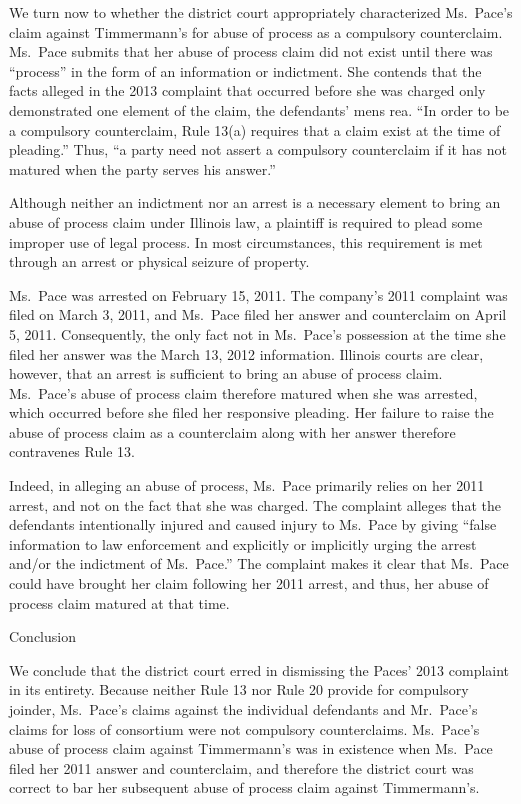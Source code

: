 \documentclass[11pt,letterpaper,twoside]{article}
\begin{document}
We turn now to whether the district court appropriately characterized
Ms.~Pace's claim against Timmermann's for abuse of process as a
compulsory counterclaim. Ms.~Pace submits that her abuse of process
claim did not exist until there was ``process'' in the form of an
information or indictment. She contends that the facts alleged in the
2013 complaint that occurred before she was charged only demonstrated
one element of the claim, the defendants' mens rea. ``In order to be a
compulsory counterclaim, Rule 13(a) requires that a claim exist at the
time of pleading.'' Thus, ``a party need not assert a compulsory
counterclaim if it has not matured when the party serves his answer.''

Although neither an indictment nor an arrest is a necessary element to
bring an abuse of process claim under Illinois law, a plaintiff is
required to plead some improper use of legal process. In most
circumstances, this requirement is met through an arrest or physical
seizure of property.

Ms.~Pace was arrested on February 15, 2011. The company's 2011 complaint
was filed on March 3, 2011, and Ms.~Pace filed her answer and
counterclaim on April 5, 2011. Consequently, the only fact not in
Ms.~Pace's possession at the time she filed her answer was the March 13,
2012 information. Illinois courts are clear, however, that an arrest is
sufficient to bring an abuse of process claim. Ms.~Pace's abuse of
process claim therefore matured when she was arrested, which occurred
before she filed her responsive pleading. Her failure to raise the abuse
of process claim as a counterclaim along with her answer therefore
contravenes Rule 13.

Indeed, in alleging an abuse of process, Ms.~Pace primarily relies on
her 2011 arrest, and not on the fact that she was charged. The complaint
alleges that the defendants intentionally injured and caused injury to
Ms.~Pace by giving ``false information to law enforcement and explicitly
or implicitly urging the arrest and/or the indictment of Ms.~Pace.'' The
complaint makes it clear that Ms.~Pace could have brought her claim
following her 2011 arrest, and thus, her abuse of process claim matured
at that time.

{Conclusion}

We conclude that the district court erred in dismissing the Paces' 2013
complaint in its entirety. Because neither Rule 13 nor Rule 20 provide
for compulsory joinder, Ms.~Pace's claims against the individual
defendants and Mr.~Pace's claims for loss of consortium were not
compulsory counterclaims. Ms.~Pace's abuse of process claim against
Timmermann's was in existence when Ms.~Pace filed her 2011 answer and
counterclaim, and therefore the district court was correct to bar her
subsequent abuse of process claim against Timmermann's.
\end{document}
